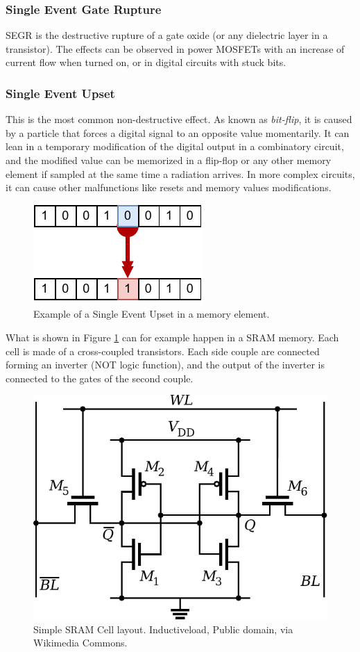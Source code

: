 \subsubsection{Single Event Gate Rupture}
SEGR is the destructive rupture of a gate oxide (or any dielectric layer in a transistor). The effects can be observed in power MOSFETs with an increase of current flow when turned on, or in digital circuits with stuck bits. 

\subsubsection{Single Event Upset}
This is the most common non-destructive effect. As known as \textit{bit-flip}, it is caused by a particle that forces a digital signal to an opposite value momentarily. It can lean in a temporary modification of the digital output in a combinatory circuit, and the modified value can be memorized in a flip-flop or any other memory element if sampled at the same time a radiation arrives. In more complex circuits, it can cause other malfunctions like resets and memory values modifications. \bigskip

\begin{figure}[H]
\centering
\includegraphics[height=0.2\linewidth]{images/chapter2/SEU_EXAMPLE.pdf}
\caption{Example of a Single Event Upset in a memory element.}
\label{fig:seu_example}
\end{figure}

What is shown in Figure \ref{fig:seu_example} can for example happen in a SRAM memory. Each cell is made of a cross-coupled transistors. Each side couple are connected forming an inverter (NOT logic function), and the output of the inverter is connected to the gates of the second couple.  

\begin{figure}[H]
\centering
\includegraphics[height=0.4\linewidth]{images/chapter2/SRAM_CELL.pdf}
\caption{Simple SRAM Cell layout. Inductiveload, Public domain, via Wikimedia Commons.}
\label{fig:sram_cell_layout}
\end{figure}

